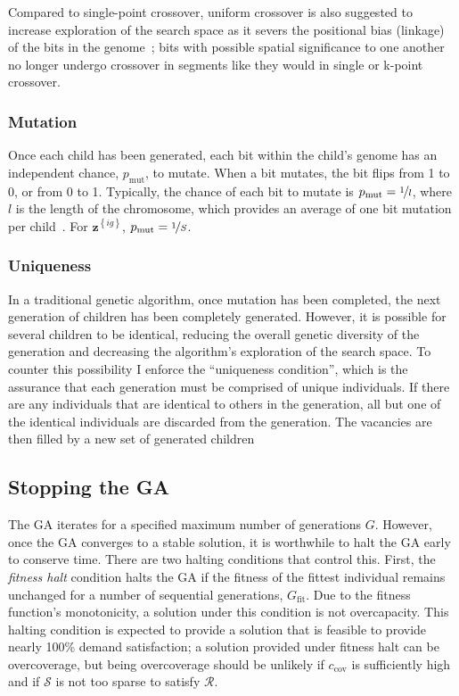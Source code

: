 \documentclass[12pt,dvipsnames]{report}
\begin{document}
Compared to single-point crossover, uniform crossover is also suggested to increase exploration of the search space as it severs the positional bias (linkage) of the bits in the genome~\cite{782011}; bits with possible spatial significance to one another no longer undergo crossover in segments like they would in single or k-point crossover.

\subsubsection{Mutation}

Once each child has been generated, each bit within the child's genome has an independent chance, $p_{\text{mut}}$, to mutate.  When a bit mutates, the bit flips from 1 to 0, or from 0 to 1.  Typically, the chance of each bit to mutate is $p_{\text{mut}} = \nicefrac{1}{l}$, where $l$ is the length of the chromosome, which provides an average of one bit mutation per child~\cite{GREENWELL19951,Deb2011}.  For $\textbf{z}^{\left\{ ig \right\}}$, $p_{\text{mut}} = \nicefrac{1}{S}$.

\subsubsection{Uniqueness}

In a traditional genetic algorithm, once mutation has been completed, the next generation of children has been completely generated.  However, it is possible for several children to be identical, reducing the overall genetic diversity of the generation and decreasing the algorithm's exploration of the search space.  To counter this possibility I enforce the ``uniqueness condition'', which is the assurance that each generation must be comprised of unique individuals.  If there are any individuals that are identical to others in the generation, all but one of the identical individuals are discarded from the generation.  The vacancies are then filled by a new set of generated children

\subsection{Stopping the GA} \label{subsec:ga_stop}

The GA iterates for a specified maximum number of generations $G$.  However, once the GA converges to a stable solution, it is worthwhile to halt the GA early to conserve time.  There are two halting conditions that control this.  First, the \emph{fitness halt} condition halts the GA if the fitness of the fittest individual remains unchanged for a number of sequential generations, $G_{\text{fit}}$.  Due to the fitness function's monotonicity, a solution under this condition is not overcapacity.  This halting condition is expected to provide a solution that is feasible to provide nearly 100\% demand satisfaction; a solution provided under fitness halt can be overcoverage, but being overcoverage should be unlikely if $c_{\text{cov}}$ is sufficiently high and if $\mathcal{S}$ is not too sparse to satisfy $\mathcal{R}$.
\end{document}
